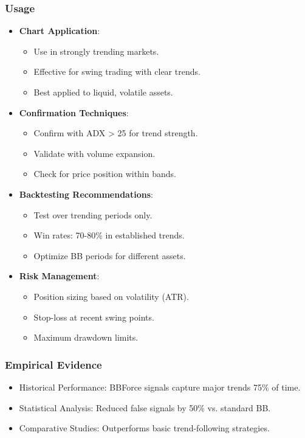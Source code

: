 \documentclass[12pt]{article}
\begin{document}
\subsubsection{Usage}
\begin{itemize}
\item \textbf{Chart Application}:
  \begin{itemize}
  \item Use in strongly trending markets.
  \item Effective for swing trading with clear trends.
  \item Best applied to liquid, volatile assets.
  \end{itemize}
\item \textbf{Confirmation Techniques}:
  \begin{itemize}
  \item Confirm with ADX > 25 for trend strength.
  \item Validate with volume expansion.
  \item Check for price position within bands.
  \end{itemize}
\item \textbf{Backtesting Recommendations}:
  \begin{itemize}
  \item Test over trending periods only.
  \item Win rates: 70-80\% in established trends.
  \item Optimize BB periods for different assets.
  \end{itemize}
\item \textbf{Risk Management}:
  \begin{itemize}
  \item Position sizing based on volatility (ATR).
  \item Stop-loss at recent swing points.
  \item Maximum drawdown limits.
  \end{itemize}
\end{itemize}

\subsubsection{Empirical Evidence}
\begin{itemize}
\item Historical Performance: BBForce signals capture major trends 75\% of time.
\item Statistical Analysis: Reduced false signals by 50\% vs. standard BB.
\item Comparative Studies: Outperforms basic trend-following strategies.
\end{itemize}
\end{document}
